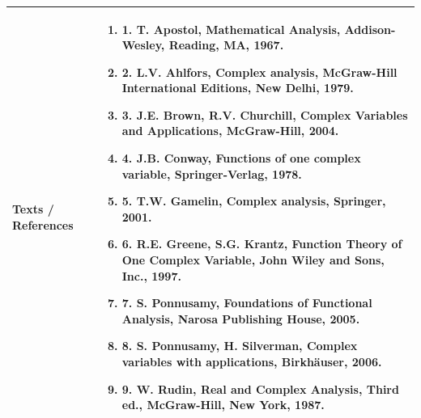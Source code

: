 \documentclass[11pt,a4paper]{article}
\begin{document}
\vspace{8pt}
\renewcommand{\arraystretch}{1.3}
\begin{tabularx}{\textwidth}{|p{3.2cm}|X|}
\hline
\textbf{Texts / References} & \begin{enumerate}[leftmargin=*,noitemsep,topsep=2pt]  \item 1. T. Apostol, Mathematical Analysis, Addison-Wesley, Reading, MA, 1967.  \item 2. L.V. Ahlfors, Complex analysis, McGraw-Hill International Editions, New Delhi, 1979.  \item 3. J.E. Brown, R.V. Churchill, Complex Variables and Applications, McGraw-Hill, 2004.  \item 4. J.B. Conway, Functions of one complex variable, Springer-Verlag, 1978.  \item 5. T.W. Gamelin, Complex analysis, Springer, 2001.  \item 6. R.E. Greene, S.G. Krantz, Function Theory of One Complex Variable, John Wiley and Sons,  Inc., 1997.  \item 7. S. Ponnusamy, Foundations of Functional Analysis, Narosa Publishing House, 2005.  \item 8. S. Ponnusamy, H. Silverman, Complex variables with applications, Birkhäuser, 2006.  \item 9. W. Rudin, Real and Complex Analysis, Third ed., McGraw-Hill, New York, 1987.\end{enumerate} \\
\hline
\end{tabularx}
\clearpage
\end{document}
